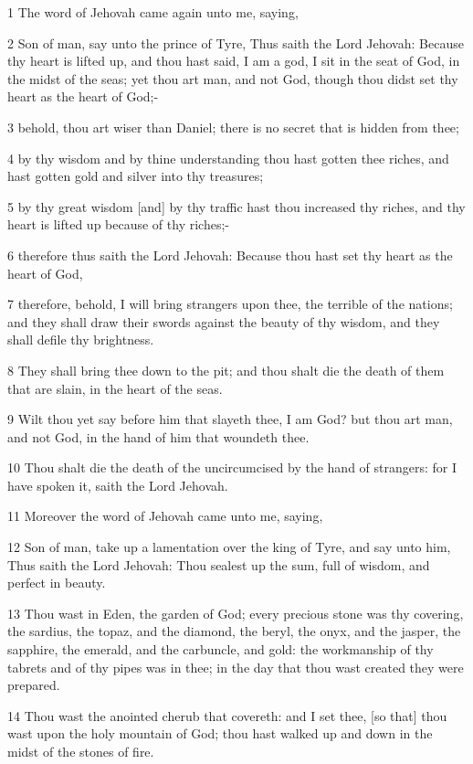 \par 1 The word of Jehovah came again unto me, saying,
\par 2 Son of man, say unto the prince of Tyre, Thus saith the Lord Jehovah: Because thy heart is lifted up, and thou hast said, I am a god, I sit in the seat of God, in the midst of the seas; yet thou art man, and not God, though thou didst set thy heart as the heart of God;-
\par 3 behold, thou art wiser than Daniel; there is no secret that is hidden from thee;
\par 4 by thy wisdom and by thine understanding thou hast gotten thee riches, and hast gotten gold and silver into thy treasures;
\par 5 by thy great wisdom [and] by thy traffic hast thou increased thy riches, and thy heart is lifted up because of thy riches;-
\par 6 therefore thus saith the Lord Jehovah: Because thou hast set thy heart as the heart of God,
\par 7 therefore, behold, I will bring strangers upon thee, the terrible of the nations; and they shall draw their swords against the beauty of thy wisdom, and they shall defile thy brightness.
\par 8 They shall bring thee down to the pit; and thou shalt die the death of them that are slain, in the heart of the seas.
\par 9 Wilt thou yet say before him that slayeth thee, I am God? but thou art man, and not God, in the hand of him that woundeth thee.
\par 10 Thou shalt die the death of the uncircumcised by the hand of strangers: for I have spoken it, saith the Lord Jehovah.
\par 11 Moreover the word of Jehovah came unto me, saying,
\par 12 Son of man, take up a lamentation over the king of Tyre, and say unto him, Thus saith the Lord Jehovah: Thou sealest up the sum, full of wisdom, and perfect in beauty.
\par 13 Thou wast in Eden, the garden of God; every precious stone was thy covering, the sardius, the topaz, and the diamond, the beryl, the onyx, and the jasper, the sapphire, the emerald, and the carbuncle, and gold: the workmanship of thy tabrets and of thy pipes was in thee; in the day that thou wast created they were prepared.
\par 14 Thou wast the anointed cherub that covereth: and I set thee, [so that] thou wast upon the holy mountain of God; thou hast walked up and down in the midst of the stones of fire.
